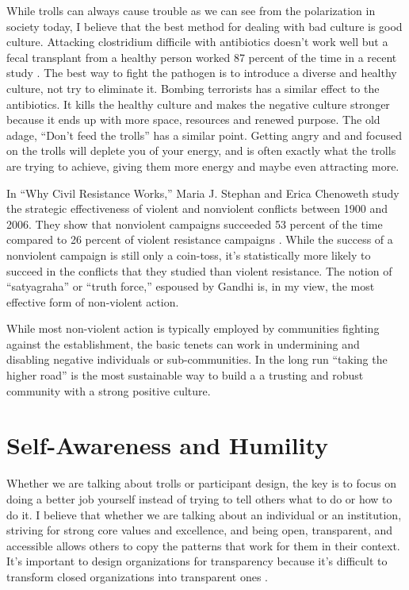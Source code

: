While trolls can always cause trouble as we can see from the polarization in society today, I believe that the best method for dealing with bad culture is good culture. Attacking clostridium difficile with antibiotics doesn't work well but a fecal transplant from a healthy person worked 87 percent of the time in a recent study \cite{jiang2017randomised}. The best way to fight the pathogen is to introduce a diverse and healthy culture, not try to eliminate it. Bombing terrorists has a similar effect to the antibiotics. It kills the healthy culture and makes the negative culture stronger because it ends up with more space, resources and renewed purpose. The old adage, ``Don't feed the trolls'' has a similar point. Getting angry and and focused on the trolls will deplete you of your energy, and is often exactly what the trolls are trying to achieve, giving them more energy and maybe even attracting more.

In ``Why Civil Resistance Works,'' Maria J. Stephan and Erica Chenoweth study the strategic effectiveness of violent and nonviolent conflicts between 1900 and 2006. They show that nonviolent campaigns succeeded 53 percent of the time compared to 26 percent of violent resistance campaigns \cite{chenoweth2011civil}. While the success of a nonviolent campaign is still only a coin-toss, it's statistically more likely to succeed in the conflicts that they studied than violent resistance. The notion of ``satyagraha'' or ``truth force,'' espoused by Gandhi \cite{majmudar2012gandhi} is, in my view, the most effective form of non-violent action.

While most non-violent action is typically employed by communities fighting against the establishment, the basic tenets can work in undermining and disabling negative individuals or sub-communities. In the long run ``taking the higher road'' is the most sustainable way to build a a trusting and robust community with a strong positive culture.

\section{Self-Awareness and Humility} 

Whether we are talking about trolls or participant design, the key is to focus on doing a better job yourself instead of trying to tell others what to do or how to do it. I believe that whether we are talking about an individual or an institution, striving for strong core values and excellence, and being open, transparent, and accessible allows others to copy the patterns that work for them in their context. It's important to design organizations for transparency because it's difficult to transform closed organizations into transparent ones \cite{Ito2011Designings}.

